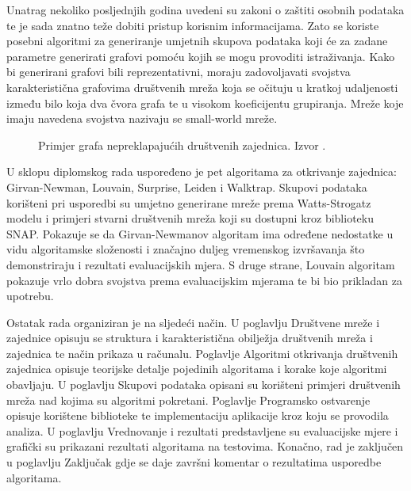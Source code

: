 \documentclass[times, utf8, diplomski]{fer}
\begin{document}
Unatrag nekoliko posljednjih  godina uvedeni su zakoni o zaštiti osobnih podataka te je sada znatno teže dobiti pristup korisnim informacijama. Zato se koriste posebni algoritmi za generiranje umjetnih skupova podataka koji će za zadane parametre generirati grafovi pomoću kojih se mogu provoditi istraživanja. Kako bi generirani grafovi bili reprezentativni, moraju zadovoljavati svojstva karakteristična grafovima društvenih mreža koja se očituju u kratkoj udaljenosti između bilo koja dva čvora grafa te u visokom koeficijentu grupiranja. Mreže koje imaju navedena svojstva nazivaju se small-world mreže.


\begin{figure}
	\caption{Primjer grafa nepreklapajućih društvenih zajednica. Izvor \cite{jayawickrama_2021}.}
	\label{fig:comm1}
\end{figure}


U sklopu diplomskog rada uspoređeno je pet algoritama za otkrivanje zajednica: Girvan-Newman, Louvain, Surprise, Leiden i Walktrap. Skupovi podataka korišteni pri usporedbi su umjetno generirane mreže prema Watts-Strogatz modelu i  primjeri stvarni društvenih mreža koji su dostupni kroz biblioteku SNAP. Pokazuje se da Girvan-Newmanov algoritam ima određene nedostatke u vidu algoritamske složenosti i značajno duljeg vremenskog izvršavanja što demonstriraju i rezultati evaluacijskih mjera. S druge strane, Louvain algoritam pokazuje vrlo dobra svojstva prema evaluacijskim mjerama te bi bio prikladan za upotrebu.

Ostatak rada organiziran je na sljedeći način. U poglavlju Društvene mreže i zajednice opisuju se struktura i karakteristična obilježja društvenih mreža i zajednica te način prikaza u računalu. Poglavlje Algoritmi otkrivanja društvenih zajednica opisuje teorijske detalje pojedinih algoritama i korake koje algoritmi obavljaju. U poglavlju Skupovi podataka opisani su korišteni primjeri društvenih mreža nad kojima su algoritmi pokretani. Poglavlje Programsko ostvarenje opisuje korištene biblioteke te implementaciju aplikacije kroz koju se provodila analiza. U poglavlju Vrednovanje i rezultati predstavljene su evaluacijske mjere i grafički su prikazani rezultati algoritama na testovima. Konačno, rad je zaključen u poglavlju Zaključak gdje se daje završni komentar o rezultatima usporedbe algoritama.
\end{document}
